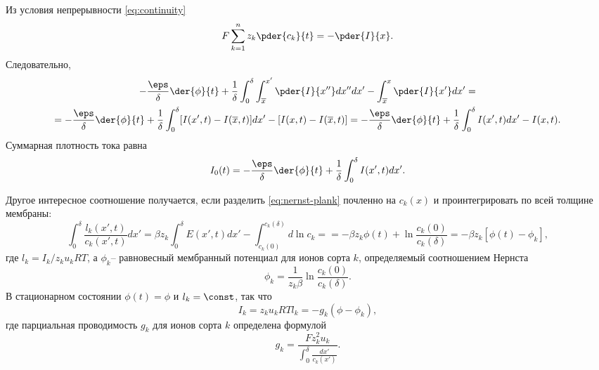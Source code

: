 Из условия непрерывности \eqref{eq:continuity}
\begin{equation}
    F\sum_{k=1}^n z_k\pder{c_k}{t} = -\pder{I}{x}.
\end{equation}
Следовательно,
\begin{gather}
    -\frac{\eps}{\delta}\der{\phi}{t} +
    \frac{1}{\delta}\int_0^\delta \int_{\overline{x}}^{x'} \pder{I}{x''} dx'' dx' -
    \int_{\overline{x}}^x \pder{I}{x'} dx' = \\ =
    -\frac{\eps}{\delta}\der{\phi}{t} +
    \frac{1}{\delta}\int_0^\delta [I(x', t) - I(\overline{x}, t)] dx' -
    [I(x, t) - I(\overline{x}, t)] = -\frac{\eps}{\delta}\der{\phi}{t} +
    \frac{1}{\delta}\int_0^\delta I(x', t) dx' - I(x, t).
\end{gather}
Суммарная плотность тока равна
\begin{equation}
    I_0(t) = -\frac{\eps}{\delta}\der{\phi}{t} +
        \frac{1}{\delta}\int_0^\delta I(x', t) dx'.
\end{equation}

Другое интересное соотношение получается, если разделить \eqref{eq:nernst-plank}
почленно на \( c_k(x) \) и проинтегрировать по всей толщине мембраны:
\begin{equation}
    \int_0^\delta \frac{l_k(x', t)}{c_k(x', t)} dx' =
    \beta z_k \int_0^\delta E(x', t) dx' - \int_{c_k(0)}^{c_k(\delta)} d\ln c_k=
    = -\beta z_k \phi(t) + \ln\frac{c_k(0)}{c_k(\delta)} =
    -\beta z_k[\phi(t) - \phi_k],
\end{equation}
где \( l_k = I_k / z_k u_k RT \), а \( \phi_k \)-- равновесный мембранный
потенциал для ионов сорта \( k \), определяемый соотношением Нернста
\[
    \phi_k = \frac{1}{z_k\beta}\ln\frac{c_k(0)}{c_k(\delta)}.
\]
В стационарном состоянии \( \phi(t) = \phi \) и \( l_k = \const \), так что
\begin{equation}
    I_k = z_k u_k RT l_k = -g_k(\phi - \phi_k),
    \label{eq:CVC}
\end{equation}
где парциальная проводимость \( g_k \) для ионов сорта \( k \) определена
формулой
\begin{equation}
    g_k = \frac{F z_k^2 u_k}{\int_0^\delta\frac{dx'}{c_k(x')}}.
    \label{eq:conductivity}
\end{equation}

